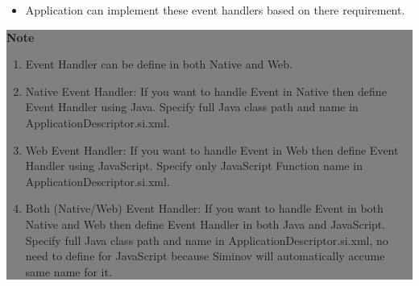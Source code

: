 \begin{enumerate}
\begin{itemize}
			\item \small Application can implement these event handlers based on there requirement.

		\end{itemize}

		\begin{center}
			\colorbox{grey}{
				\parbox[t]{.8\linewidth}{
					\fontsize{11pt}{11pt}\selectfont %
					\vspace*{0.1cm} %
		
					\hfill \textbf{Note} \\

					\hfill 	
					\begin{enumerate}
			
						\item \small Event Handler can be define in both Native and Web.

						\item \small Native Event Handler: If you want to handle Event in Native then define Event Handler using Java. Specify full Java class path and name in ApplicationDescriptor.si.xml.

						\item \small Web Event Handler: If you want to handle Event in Web then define Event Handler using JavaScript. Specify only JavaScript Function name in ApplicationDescriptor.si.xml.

						\item \small Both (Native/Web) Event Handler: If you want to handle Event in both Native and Web then define Event Handler in both Java and JavaScript. Specify full Java class path and name in ApplicationDescriptor.si.xml, no need to define for JavaScript because Siminov will automatically accume same name for it.

					\end{enumerate}

					\vspace*{0.0cm} %
		}
}

\end{center}


\end{enumerate}

